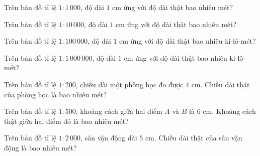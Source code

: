 
\begin{ex}
  Trên bản đồ tỉ lệ $1 : 1\,000$, độ dài $1\text{ cm}$ ứng với độ dài thật bao nhiêu mét?
\end{ex}

\begin{ex}
  Trên bản đồ tỉ lệ $1 : 10\,000$, độ dài $1\text{ cm}$ ứng với độ dài thật bao nhiêu mét?
\end{ex}

\begin{ex}
  Trên bản đồ tỉ lệ $1 : 100\,000$, độ dài $1\text{ cm}$ ứng với độ dài thật bao nhiêu ki-lô-mét?
\end{ex}

\begin{ex}
  Trên bản đồ tỉ lệ $1 : 1\,000\,000$, độ dài $1\text{ cm}$ ứng với độ dài thật bao nhiêu ki-lô-mét?
\end{ex}

\begin{ex}
  Trên bản đồ tỉ lệ $1 : 200$, chiều dài một phòng học đo được $4\text{ cm}$. Chiều dài thật của phòng học là bao nhiêu mét?
\end{ex}

\begin{ex}
  Trên bản đồ tỉ lệ $1 : 500$, khoảng cách giữa hai điểm $A$ và $B$ là $6\text{ cm}$. Khoảng cách thật giữa hai điểm đó là bao nhiêu mét?
\end{ex}

\begin{ex}
  Trên bản đồ tỉ lệ $1 : 2\,000$, sân vận động dài $5\text{ cm}$. Chiều dài thật của sân vận động là bao nhiêu mét?
\end{ex}

